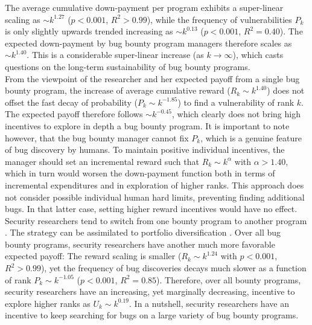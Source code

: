 The average cumulative down-payment per program exhibits a super-linear scaling as $\sim k^{1.27}$ ($ p < 0.001$, $R^2 > 0.99$), while the frequency of vulnerabilities $P_k$ is only slightly upwards trended increasing as $ \sim k^{0.13}$ ($ p < 0.001$, $R^2 = 0.40$). The expected down-payment by bug bounty program managers therefore scales as $\sim k^{1.40}$. This is a considerable super-linear increase (as $k \rightarrow \infty$), which  casts questions on the long-term sustainability of bug bounty programs. \\

From the viewpoint of the researcher and her expected payoff from a single bug bounty program, the increase of average cumulative reward ($R_{k} \sim k^{1.40}$) does not offset the fast decay of probability ($P_{k} \sim k^{-1.85}$) to find a vulnerability of rank $k$. The expected payoff therefore follows $\sim k^{-0.45}$, which clearly does not bring high incentives to explore in depth a bug bounty program. It is important to note however, that the bug bounty manager cannot fix $P_k$, which is a genuine feature of bug discovery by humans. To maintain positive individual incentives, the manager should set an incremental reward such that $R_k \sim k^{\alpha}$ with $\alpha > 1.40$, which in turn would worsen the down-payment function both in terms of incremental expenditures and in exploration of higher ranks. This approach does not consider possible individual human hard limits, preventing finding additional bugs. In that latter case, setting higher reward incentives would have no effect.\\

Security researchers tend to switch from one bounty program to another program \cite{zhao2014exploratory,zhao2015empirical}. The strategy can be assimilated to portfolio diversification \cite{goetzmann2008equity}. Over all bug bounty programs, security researchers have another much more favorable expected payoff: The reward scaling is smaller ($R_{k} \sim k^{1.24}$ with $ p < 0.001$, $R^2 > 0.99$), yet the frequency of bug discoveries decays much slower as a function of rank $P_{k} \sim k^{-1.05}$ ($ p < 0.001$, $R^2 = 0.85$). Therefore, over all bounty programs, security researchers have an increasing, yet marginally decreasing, incentive to explore higher ranks as $U_k \sim k^{0.19}$. In a nutshell, security researchers have an incentive to keep searching for bugs on a large variety of bug bounty programs.

